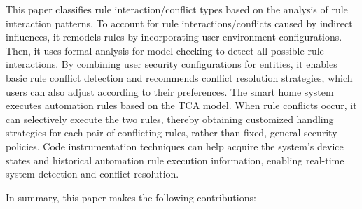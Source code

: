 This paper classifies rule interaction/conflict types based on the analysis of rule interaction patterns. To account for rule interactions/conflicts caused by indirect influences, it remodels rules by incorporating user environment configurations. Then, it uses formal analysis for model checking to detect all possible rule interactions. By combining user security configurations for entities, it enables basic rule conflict detection and recommends conflict resolution strategies, which users can also adjust according to their preferences. The smart home system executes automation rules based on the TCA model. When rule conflicts occur, it can selectively execute the two rules, thereby obtaining customized handling strategies for each pair of conflicting rules, rather than fixed, general security policies. Code instrumentation techniques can help acquire the system's device states and historical automation rule execution information, enabling real-time system detection and conflict resolution.

In summary, this paper makes the following contributions:

